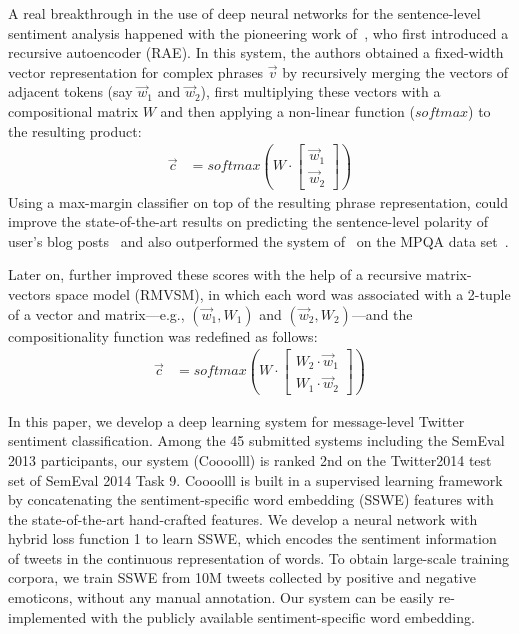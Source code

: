 
\citet{Yessenalina:11}

A real breakthrough in the use of deep neural networks for the
sentence-level sentiment analysis happened with the pioneering work
of~\citet{Socher:11}, who first introduced a recursive autoencoder
(RAE).  In this system, the authors obtained a fixed-width vector
representation for complex phrases $\vec{v}$ by recursively merging
the vectors of adjacent tokens (say $\vec{w}_1$ and $\vec{w}_2$),
first multiplying these vectors with a compositional matrix $W$ and
then applying a non-linear function ($softmax$) to the resulting
product:
\begin{align*}
  \vec{c} &= softmax\left(W\cdot\begin{bmatrix}
  \vec{w}_1\\
  \vec{w}_2
  \end{bmatrix}\right)
\end{align*}
Using a max-margin classifier on top of the resulting phrase
representation, \citet{Socher:11} could improve the state-of-the-art
results on predicting the sentence-level polarity of user's blog
posts~\cite{Potts:10} and also outperformed the system
of~\citet{Nasukawa:03} on the MPQA data set~\cite{Wiebe:05}.

Later on, \citet{Socher:12} further improved these scores with the
help of a recursive matrix-vectors space model (RMVSM), in which each
word was associated with a 2-tuple of a vector and matrix---e.g.,
$(\vec{w}_1, W_1)$ and $(\vec{w}_2, W_2)$---and the compositionality
function was redefined as follows:
\begin{align*}
  \vec{c} &= softmax\left(W\cdot\begin{bmatrix}
  W_2\cdot\vec{w}_1\\
  W_1\cdot\vec{w}_2
  \end{bmatrix}\right)
\end{align*}



In this paper, we develop a deep learning system for message-level
Twitter sentiment classification. Among the 45 submitted systems
including the SemEval 2013 participants, our system (Coooolll) is
ranked 2nd on the Twitter2014 test set of SemEval 2014 Task
9. Coooolll is built in a supervised learning framework by
concatenating the sentiment-specific word embedding (SSWE) features
with the state-of-the-art hand-crafted features.  We develop a neural
network with hybrid loss function 1 to learn SSWE, which encodes the
sentiment information of tweets in the continuous representation of
words.  To obtain large-scale training corpora, we train SSWE from 10M
tweets collected by positive and negative emoticons, without any
manual annotation. Our system can be easily re-implemented with the
publicly available sentiment-specific word embedding.

